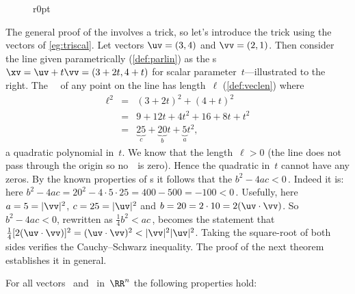 \begin{wrapfigure}r{0pt}
\end{wrapfigure}
\begin{example} 
The general proof of the  involves a trick, so let's introduce the trick using the vectors of \cref{eg:triscal}.
Let vectors \(\uv=(3,4)\) and \(\vv=(2,1)\).
Then consider the line given parametrically (\cref{def:parlin}) as the s \(\xv=\uv+t\vv=(3+2t,4+t)\) for scalar parameter~\(t\)---illustrated to the right.
The ~\xv\ of any point on the line has length~\(\ell\) (\cref{def:veclen}) where
\begin{eqnarray*}
\ell^2&=&(3+2t)^2+(4+t)^2
\\&=&9+12t+4t^2+16+8t+t^2
\\&=&\underbrace{25}_{c}+\underbrace{20}_{b}t+\underbrace{5}_{a}t^2,
\end{eqnarray*}
a quadratic polynomial in~\(t\).
We know that the length~\(\ell>0\)  (the line does not pass through the origin so no~\xv\ is zero).
Hence the quadratic in~\(t\) cannot have any zeros.
By the known properties of s it follows that the  \(b^2-4ac<0\)\,.
Indeed it is: here \(b^2-4ac=20^2-4\cdot5\cdot25=400-500=-100<0\)\,.
Usefully, here \(a=5=|\vv|^2\), \(c=25=|\uv|^2\) and \(b=20=2\cdot10=2(\uv\cdot\vv)\).
So \(b^2-4ac<0\), rewritten as \(\tfrac14b^2<ac\)\,, becomes the statement that \(\tfrac14[2(\uv\cdot\vv)]^2=(\uv\cdot\vv)^2<|\vv|^2|\uv|^2\).
Taking the square-root of both sides verifies the Cauchy--Schwarz inequality.  
The proof of the next theorem establishes it in general.
\end{example}






\begin{theorem} \label{thm:triscal}
For all vectors \uv\ and \vv\ in~\(\RR^n\) the following properties hold:
\end{theorem}

